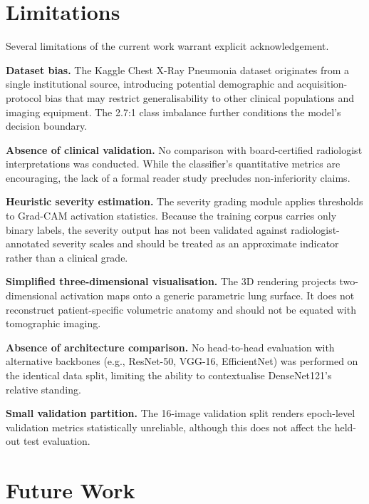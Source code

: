 \documentclass[conference]{IEEEtran}
\begin{document}
\section{Limitations}

Several limitations of the current work warrant explicit acknowledgement.

\textbf{Dataset bias.} The Kaggle Chest X-Ray Pneumonia dataset originates from a single institutional source, introducing potential demographic and acquisition-protocol bias that may restrict generalisability to other clinical populations and imaging equipment. The 2.7:1 class imbalance further conditions the model's decision boundary.

\textbf{Absence of clinical validation.} No comparison with board-certified radiologist interpretations was conducted. While the classifier's quantitative metrics are encouraging, the lack of a formal reader study precludes non-inferiority claims.

\textbf{Heuristic severity estimation.} The severity grading module applies thresholds to Grad-CAM activation statistics. Because the training corpus carries only binary labels, the severity output has not been validated against radiologist-annotated severity scales and should be treated as an approximate indicator rather than a clinical grade.

\textbf{Simplified three-dimensional visualisation.} The 3D rendering projects two-dimensional activation maps onto a generic parametric lung surface. It does not reconstruct patient-specific volumetric anatomy and should not be equated with tomographic imaging.

\textbf{Absence of architecture comparison.} No head-to-head evaluation with alternative backbones (e.g., ResNet-50, VGG-16, EfficientNet) was performed on the identical data split, limiting the ability to contextualise DenseNet121's relative standing.

\textbf{Small validation partition.} The 16-image validation split renders epoch-level validation metrics statistically unreliable, although this does not affect the held-out test evaluation.

\section{Future Work}
\end{document}

